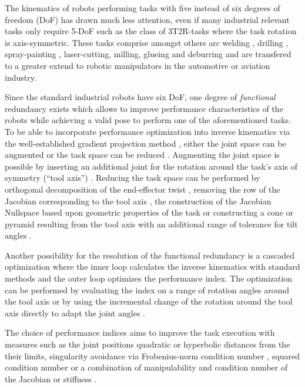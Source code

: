 \documentclass[twocolumn,10pt]{IFTOMM}
\begin{document}
The kinematics of robots performing tasks with five instead of six degrees of freedom (DoF) has drawn much less attention, even if many industrial relevant tasks only require 5-DoF such as the class of 3T2R-tasks where the task rotation is axis-symmetric.
These tasks comprise amongst others arc welding \cite{HuoBar2005}, drilling \cite{ZhuQuCaoYan2013,GuoDonKe2015}, spray-painting \cite{FromGra2010}, laser-cutting, milling, glueing and deburring and are transfered to a greater extend to robotic manipulators in the automotive or aviation industry.

Since the standard industrial robots have six DoF, one degree of \emph{functional} redundancy exists which allows to improve performance characteristics of the robots while achieving a valid pose to perform one of the aforementioned tasks.
To be able to incorporate performance optimization into inverse kinematics via the well-established gradient projection method \cite{Yoshikawa1984}, either the joint space can be augmented or the task space can be reduced \cite{Huo2009}.
Augmenting the joint space is possible by inserting an additional joint for the rotation around the task's axis of symmetry (``tool axis'') \cite{Baron2000}.
Reducing the task space can be performed by orthogonal decomposition of the end-effector twist \cite{HuoBar2005}, removing the row of the Jacobian corresponding to the tool axis \cite{Zlajpah2017}, the construction of the Jacobian Nullspace based upon geometric properties of the task \cite{LegerAng2016} or constructing a cone or pyramid resulting from the tool axis with an additional range of tolerance for tilt angles \cite{FromGra2010}.

Another possibility for the resolution of the functional redundancy is a cascaded optimization where the inner loop calculates the inverse kinematics with standard methods and the outer loop optimizes the performance index.
The optimization can be performed by evaluating the index on a range of rotation angles around the tool axis \cite{ZhuQuCaoYan2013} or by using the incremental change of the rotation around the tool axis directly to adapt the joint angles \cite{GuoDonKe2015}.

The choice of performance indices aims to improve the task execution with measures such as the joint positions quadratic \cite{HuoBar2005} or hyperbolic \cite{ZhuQuCaoYan2013} distances from the their limits, singularity avoidance via Frobenius-norm condition number \cite{ZhuQuCaoYan2013}, squared condition number \cite{LegerAng2016} or a combination of manipulability and condition number of the Jacobian \cite{HuoBar2008} or stiffness \cite{GuoDonKe2015}.
\end{document}
